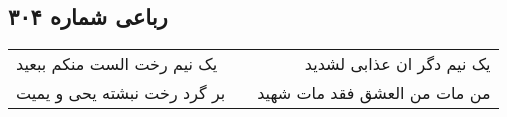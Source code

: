 \begin{center}
\section*{رباعی شماره ۳۰۴}
\label{sec:sh304}
\begin{longtable}{l p{0.5cm} r}
یک نیم رخت الست منکم ببعید
&&
یک نیم دگر ان عذابی لشدید
\\
بر گرد رخت نبشته یحی و یمیت
&&
من مات من العشق فقد مات شهید
\\
\end{longtable}
\end{center}
